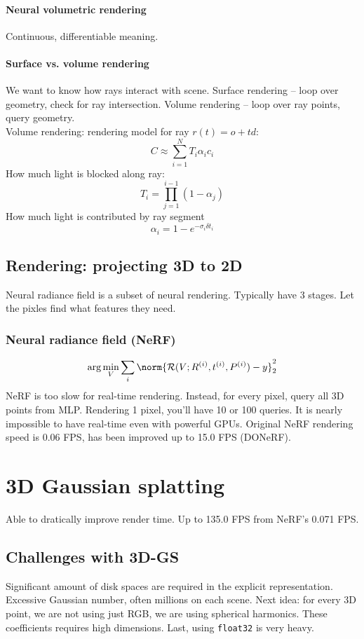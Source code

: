 \documentclass[11pt, oneside]{book}
\begin{document}
\subsubsection{Neural volumetric rendering}
Continuous, differentiable meaning.
\subsubsection{Surface vs. volume rendering}
We want to know how rays interact with scene. Surface rendering -- loop over geometry, check for ray intersection. Volume rendering -- loop over ray points, query geometry. \\ 

\noindent Volume rendering: rendering model for ray $r(t) = o + td$:
\[
  C \approx \sum_{i=1}^N T_i \alpha_i c_i
\]
How much light is blocked along ray: 
\[
  T_i = \prod_{j=1}^{i-1}(1-\alpha_j)
\]
How much light is contributed by ray segment 
\[
  \alpha_i = 1 - e^{-\sigma_i \delta t_i}
\]
\section{Rendering: projecting 3D to 2D}
Neural radiance field is a subset of neural rendering. Typically have 3 stages. Let the pixles find what features they need.
\subsection{Neural radiance field (NeRF)}
\[
  \arg\min_{V} \sum_{i} \norm{\mathcal{R}(V; R^{(i)}, t^{(i)}, P^{(i)}) - y}_2^2 
\]
NeRF is too slow for real-time rendering. Instead, for every pixel, query all 3D points from MLP. Rendering 1 pixel, you'll have 10 or 100 queries. It is nearly impossible to have real-time even with powerful GPUs. Original NeRF rendering speed is 0.06 FPS, has been improved up to 15.0 FPS (DONeRF).

\chapter{3D Gaussian splatting}
Able to dratically improve render time. Up to 135.0 FPS from NeRF's 0.071 FPS.
\section{Challenges with 3D-GS}
Significant amount of disk spaces are required in the explicit representation. Excessive Gaussian number, often millions on each scene. Next idea: for every 3D point, we are not using just RGB, we are using spherical harmonics. These coefficients requires high dimensions. Last, using \texttt{float32} is very heavy. 
\end{document}
